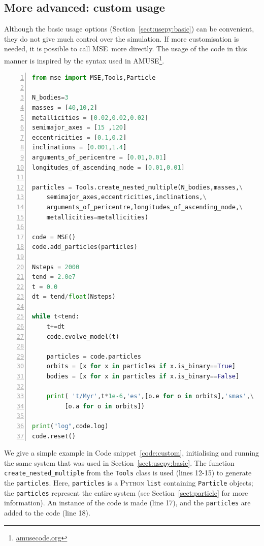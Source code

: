 \documentclass[a4paper,11pt]{article}
\newcommand{\mse}{\textsc{MSE}}
\renewcommand{\S}{Section}
\newcommand{\code}{Code snippet}
\begin{document}
\subsection{More advanced: custom usage}
Although the basic usage options (\S~\ref{sect:usepy:basic}) can be convenient, they do not give much control over the simulation. If more customisation is needed, it is possible to call \mse~more directly. The usage of the code in this manner is inspired by the syntax used in \textsc{AMUSE}\footnote{\href{https://amusecode.org}{amusecode.org}}. 

\begin{lstlisting}[caption={Custom usage example within \textsc{Python} for a triple.},label={code:custom},language=Python,numbers=left]
from mse import MSE,Tools,Particle

N_bodies=3
masses = [40,10,2]
metallicities = [0.02,0.02,0.02]
semimajor_axes = [15 ,120] 
eccentricities = [0.1,0.2]
inclinations = [0.001,1.4]
arguments_of_pericentre = [0.01,0.01]
longitudes_of_ascending_node = [0.01,0.01]

particles = Tools.create_nested_multiple(N_bodies,masses,\
    semimajor_axes,eccentricities,inclinations,\
    arguments_of_pericentre,longitudes_of_ascending_node,\
    metallicities=metallicities)

code = MSE()
code.add_particles(particles)

Nsteps = 2000
tend = 2.0e7
t = 0.0
dt = tend/float(Nsteps)

while t<tend:
    t+=dt
    code.evolve_model(t)

    particles = code.particles
    orbits = [x for x in particles if x.is_binary==True]
    bodies = [x for x in particles if x.is_binary==False]
    
    print( 't/Myr',t*1e-6,'es',[o.e for o in orbits],'smas',\
         [o.a for o in orbits])

print("log",code.log)
code.reset()
\end{lstlisting}
We give a simple example in \code~\ref{code:custom}, initialising and running the same system that was used in \S~\ref{sect:usepy:basic}. The function \texttt{create\_nested\_multiple} from the \texttt{Tools} class is used (lines 12-15) to generate the \texttt{particles}. Here, \texttt{particles} is a \textsc{Python} \texttt{list} containing \texttt{Particle} objects; the \texttt{particles} represent the entire system (see \S~\ref{sect:particle} for more information). An instance of the code is made (line 17), and the \texttt{particles} are added to the code (line 18). 
\end{document}
